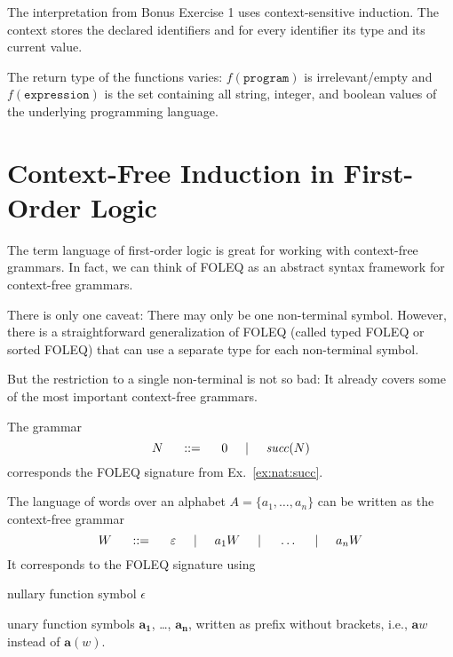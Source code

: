 \begin{example}[Interpretation]
The interpretation from Bonus Exercise 1 uses context-sensitive induction.
The context stores the declared identifiers and for every identifier its type and its current value.

The return type of the functions varies: $f(\mathtt{program})$ is irrelevant/empty and $f(\mathtt{expression})$ is the set containing all string, integer, and boolean values of the underlying programming language.
\end{example}

\section{Context-Free Induction in First-Order Logic}

The term language of first-order logic is great for working with context-free grammars.
In fact, we can think of FOLEQ as an abstract syntax framework for context-free grammars.

There is only one caveat: There may only be one non-terminal symbol.
However, there is a straightforward generalization of FOLEQ (called typed FOLEQ or sorted FOLEQ) that can use a separate type for each non-terminal symbol.

But the restriction to a single non-terminal is not so bad: It already covers some of the most important context-free grammars.

\begin{example}\label{ex:foldef:nat}
The grammar
\[N \hspace*{.5cm} ::= \hspace*{.5cm} 0\hspace*{.5cm}|\hspace*{.5cm}\mathit{succ}(N)\]
corresponds the FOLEQ signature from Ex.~\ref{ex:nat:succ}.
\end{example}

\begin{example}[Words]\label{ex:foldef:words}
The language of words over an alphabet $A=\{a_1,\ldots,a_n\}$ can be written as the context-free grammar
\[W \hspace*{.5cm} ::= \hspace*{.5cm} \varepsilon \hspace*{.5cm}|\hspace*{.5cm} a_1W \hspace*{.5cm}|\hspace*{.5cm} \ldots \hspace*{.5cm}|\hspace*{.5cm} a_nW\]
It corresponds to the FOLEQ signature using
\begin{compactitem}
\item nullary function symbol $\epsilon$
\item unary function symbols $\bm{a_1}$, \ldots, $\bm{a_n}$, written as prefix without brackets, i.e., $\bm{a}w$ instead of $\bm{a}(w)$.
\end{compactitem}
\end{example}

